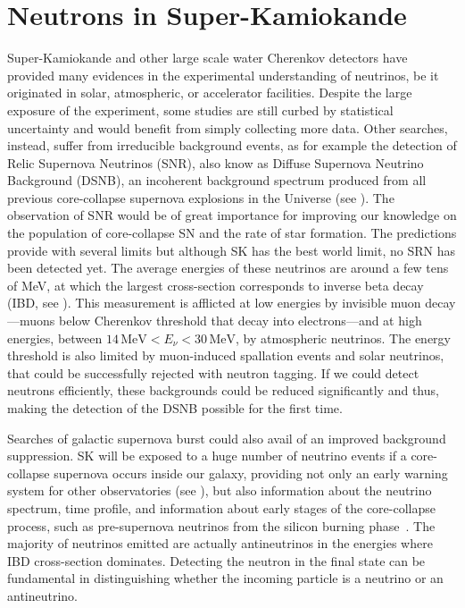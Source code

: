 \section{Neutrons in Super-Kamiokande}
\label{sec:sk_neutron}

Super-Kamiokande and other large scale water Cherenkov detectors have provided %
many evidences in the experimental understanding of neutrinos, %
be it originated in solar, atmospheric, or accelerator facilities.
Despite the large exposure of the experiment, some studies are still curbed by statistical uncertainty %
and would benefit from simply collecting more data.
Other searches, instead, suffer from irreducible background events, as for example the detection of Relic Supernova Neutrinos (SNR), %
also know as Diffuse Supernova Neutrino Background (DSNB), an incoherent background spectrum %
produced from all previous core-collapse supernova explosions in the Universe (see ).
The observation of SNR would be of great importance for improving our knowledge on the population of core-collapse SN %
and the rate of star formation.
The predictions provide with several limits but although SK has the best world limit, no SRN has been detected yet.
The average energies of these neutrinos are around a few tens of MeV, at which the largest cross-section %
corresponds to inverse beta decay (IBD, see ).
This measurement is afflicted at low energies by invisible muon decay%
---muons below Cherenkov threshold that decay into electrons---and at high energies, %
between $14\,\text{MeV} < E_\nu < 30\,\text{MeV}$, by atmospheric neutrinos.
The energy threshold is also limited by muon-induced spallation events and solar neutrinos, that could be successfully %
rejected with neutron tagging.
If we could detect neutrons efficiently, these backgrounds could be reduced significantly and thus, %
making the detection of the DSNB possible for the first time.

Searches of galactic supernova burst could also avail of an improved background suppression.
SK will be exposed to a huge number of neutrino events if a core-collapse supernova occurs inside our galaxy, %
providing not only an early warning system for other observatories (see ), %
but also information about the neutrino spectrum, time profile, and information about early stages of the core-collapse process, %
such as pre-supernova neutrinos from the silicon burning phase~\cite{Simpson:2019xwo}.
The majority of neutrinos emitted are actually antineutrinos in the energies where IBD cross-section dominates.
Detecting the neutron in the final state can be fundamental in distinguishing whether the incoming particle is %
a neutrino or an antineutrino.

